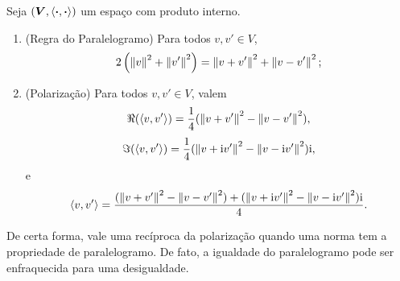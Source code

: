 \begin{exercise}
Seja $(\bm V,\left\langle{\bm{\cdot}},{\bm{\cdot}}\right\rangle)$ um espaço com produto interno.
	\begin{enumerate}
	\item (Regra do Paralelogramo) Para todos $v,v' \in V$,
		\begin{equation*}
			2\left( \left\Vert{v}\right\Vert^2 + \left\Vert{v'}\right\Vert^2 \right) = \left\Vert{v+v'}\right\Vert^2+\left\Vert{v-v'}\right\Vert^2;
		\end{equation*}

	\item (Polarização) Para todos $v,v' \in V$, valem%
		\begin{equation*}
		\Re(\left\langle{v},{v'}\right\rangle) = \frac{1}{4}(\left\Vert{v+v'}\right\Vert^2 - \left\Vert{v-v'}\right\Vert^2),
		\end{equation*}
		\begin{equation*}
		\Im(\left\langle{v},{v'}\right\rangle) = \frac{1}{4}(\left\Vert{v+\mathrm{i}v'}\right\Vert^2 - \left\Vert{v-\mathrm{i}v'}\right\Vert^2)\mathrm{i},
		\end{equation*}
e
		\begin{equation*}
		\left\langle{v},{v'}\right\rangle = \frac{(\left\Vert{v+v'}\right\Vert^2 - \left\Vert{v-v'}\right\Vert^2) + (\left\Vert{v+\mathrm{i}v'}\right\Vert^2 - \left\Vert{v-\mathrm{i}v'}\right\Vert^2) \mathrm{i}}{4}.
		\end{equation*}
	\end{enumerate}
\end{exercise}

De certa forma, vale uma recíproca da polarização quando uma norma tem a propriedade de paralelogramo. De fato, a igualdade do paralelogramo pode ser enfraquecida para uma desigualdade.

